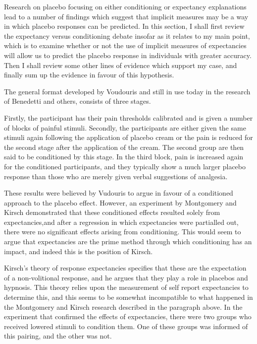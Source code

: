 Research on placebo focusing on either conditioning or expectancy explanations lead to a number of findings which suggest that implicit measures may be a way in which placebo responses can be predicted. In this section, I shall first review the expectancy versus conditioning debate insofar as it relates to my main point, which is to examine whether or not the use of implicit measures of expectancies will allow us to predict the placebo response in individuals with greater accuracy. Then I shall review some other lines of evidence which support my case, and finally sum up the evidence in favour of this hypothesis.

The general format developed by Voudouris and still in use today in the research of Benedetti \cite{Benedetti2006c} and others, consists of three stages. 

Firstly, the participant has their pain thresholds calibrated and is given a number of blocks of painful stimuli. Secondly, the participants are either given the same stimuli again following the application of placebo cream or the pain is reduced for the second stage after the application of the cream. The second group are then said to be conditioned by this stage. In the third block, pain is increased again for the conditioned participants, and they typically show a much larger placebo response than those who are merely given verbal suggestions of analgesia.  

These results were believed by Vudouris to argue in favour of a conditioned approach to the placebo effect. However, an experiment by Montgomery and Kirsch \cite{Montgomery1997} demonstrated that these conditioned effects resulted solely from expectancies,and after a regression in which expectancies were partialled out, there were no significant effects arising from conditioning. This would seem to argue that expectancies are the prime method through which conditioning has an impact, and indeed this is the position of Kirsch. 

Kirsch's \cite{Kirsch1985,Kirsch1997} theory of response expectancies specifies that these are the expectation of a non-volitional response, and he argues that they play a role in placebos and hypnosis. This theory  relies upon the measurement of self report expectancies to determine this, and this seems  to be somewhat incompatible to what happened in the Montgomery and Kirsch research described in the paragraph above. In the experiment that confirmed the effects of expectancies, there were two groups who received lowered stimuli to condition them. One of these groups was informed of this pairing, and the other was not. 

